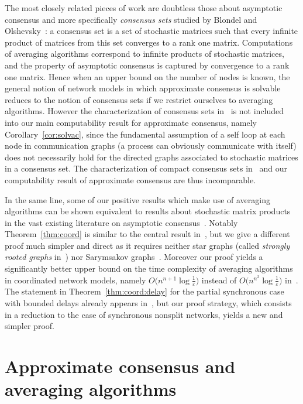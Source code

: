 \documentclass[a4paper]{article}
\theoremstyle{newthm}
\begin{document}
The most closely related pieces of work are doubtless those about asymptotic consensus
	and more specifically  {\em consensus sets} studied by Blondel and Olshevsky~\cite{BO13}:
	a consensus set is a set of stochastic matrices such that every infinite product of
	matrices from this set converges to a rank one matrix.
Computations of averaging algorithms correspond to infinite products of stochastic 
	matrices, and the property of asymptotic consensus is captured by  convergence to a rank one
	matrix.
Hence when an upper bound on the number of nodes is known, the general 
	notion  of  network models in which approximate consensus
	is solvable  reduces to the notion of consensus sets 
	if  we restrict ourselves to averaging algorithms.
However the characterization of consensus sets in~\cite{BO13}  is not  included into
	our main computability result for approximate consensus, namely Corollary~\ref{cor:solvac},
	since the fundamental assumption of a self loop at each node in  communication graphs
	(a process can obviously communicate with itself)
	does not necessarily hold for the directed graphs associated to  stochastic matrices in a consensus set.
The characterization of compact consensus sets in~\cite{BO13} and our computability result of
	approximate consensus  are thus incomparable.

In the same line, some of  our positive results which make use of averaging algorithms
	can be shown equivalent to results about stochastic matrix products in the
	vast existing literature on asymptotic consensus~\cite{DeG74,CS77,Mor05,AB06,
	CMA08a,LL10,TN11,LMMAY11,Cha13,XC12,HT13,Now13}.
Notably Theorem~\ref{thm:coord} 
	is  similar to the central result in~\cite{CMA08a}, but
	we give a different proof much simpler and direct as it requires neither
	star graphs (called {\em strongly rooted graphs}  in~\cite{CMA08a}) nor 
	Sarymsakov graphs~\cite{XC12}.
Moreover our proof yields a significantly better upper bound on the time complexity of averaging algorithms 
	in coordinated network models, namely $O \big (n^{n+1} \log \frac{1}{\varepsilon} \big)$	 instead
	of $O \big(n^{n^2} \log \frac{1}{\varepsilon} \big)$ in~\cite{CMA08b}.
The  statement in Theorem~\ref{thm:coord:delay} for the partial synchronous case with bounded delays
	already appears in~\cite{CMA08b,Cha13},
	but our proof strategy, which consists in a reduction to the case of synchronous nonsplit
	networks, yields  a new and simpler proof.



\section{Approximate consensus and averaging algorithms}
\end{document}
